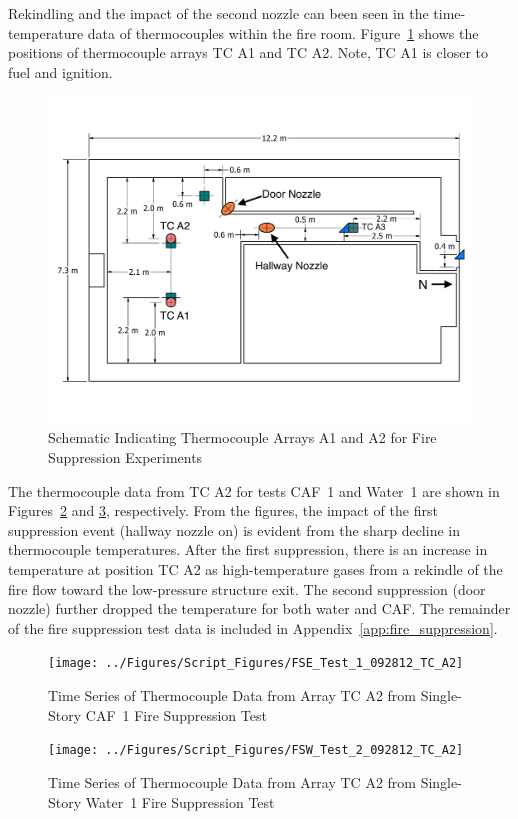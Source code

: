 \documentclass[12pt,oneside]{book}
\begin{document}
Rekindling and the impact of the second nozzle can been seen in the time-temperature data of thermocouples within the fire room. Figure~\ref{fig:fs_instruments} shows the positions of thermocouple arrays TC A1 and TC A2. Note, TC A1 is closer to fuel and ignition.

\begin{figure}[!ht]
	\includegraphics[width=.85\columnwidth]{../Figures/Floor_Plans/PDFs/East_Structure/DelCo_2012_East_Structure_Instrumentation2}
	\caption{Schematic Indicating Thermocouple Arrays A1 and A2 for Fire Suppression Experiments}
	\label{fig:fs_instruments}
\end{figure}

The thermocouple data from TC A2 for tests CAF~1 and Water~1 are shown in Figures~\ref{fig:caf1_tca2} and \ref{fig:water1_tca2}, respectively. From the figures, the impact of the first suppression event (hallway nozzle on) is evident from the sharp decline in thermocouple temperatures. After the first suppression, there is an increase in temperature at position TC A2 as high-temperature gases from a rekindle of the fire flow toward the low-pressure structure exit. The second suppression (door nozzle) further dropped the temperature for both water and CAF. The remainder of the fire suppression test data is included in Appendix~\ref{app:fire_suppression}.

\begin{figure}[!ht]
	\texttt{[image: ../Figures/Script\_Figures/FSE\_Test\_1\_092812\_TC\_A2]}
	\caption{Time Series of Thermocouple Data from Array TC A2 from Single-Story CAF~1 Fire Suppression Test}
	\label{fig:caf1_tca2}
\end{figure}

\begin{figure}[!ht]
	\texttt{[image: ../Figures/Script\_Figures/FSW\_Test\_2\_092812\_TC\_A2]}
	\caption{Time Series of Thermocouple Data from Array TC A2 from Single-Story Water~1 Fire Suppression Test}
	\label{fig:water1_tca2}
\end{figure}
\end{document}
